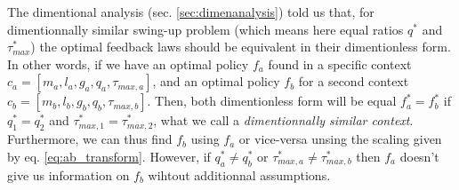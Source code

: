 The dimentional analysis (sec. \ref{sec:dimenanalysis}) told us that, for dimentionnally similar swing-up problem (which means here equal ratios $q^*$ and $\tau_{max}^*$) the optimal feedback laws should be equivalent in their dimentionless form. In other words, if we have an optimal policy $f_a$ found in a specific context $c_a = [m_a,l_a,g_a,q_a,\tau_{max,a}]$, and an optimal policy $f_b$ for a second context $c_b = [m_b,l_b,g_b,q_b,\tau_{max,b}]$. Then, both dimentionless form will be equal $f_a^*=f_b^*$ if $q^*_1 = q^*_2$ and $\tau_{max,1}^* = \tau_{max,2}^*$, what we call a \textit{dimentionnally similar context}. Furthermore, we can thus find $f_b$ using $f_a$ or vice-versa unsing the scaling given by eq. \eqref{eq:ab_transform}. However, if $q^*_a \neq q^*_b$ or $\tau_{max,a}^* \neq \tau_{max,b}^*$ then $f_a$ doesn't give us information on $f_b$ wihtout additionnal assumptions. 

